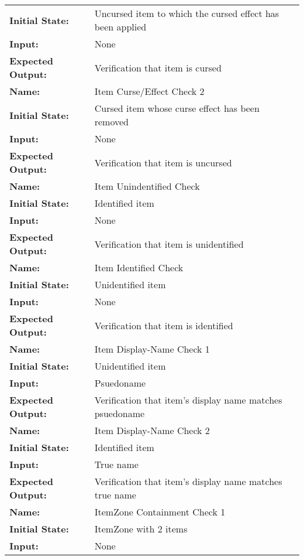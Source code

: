 \documentclass[12pt, titlepage]{article}
\begin{document}
\begin{center}
\begin{longtable}{ l | p{10cm} }
				\textbf{Initial State:} & Uncursed item to which the cursed effect has been applied\\
				\textbf{Input:} & None\\
				\textbf{Expected Output:} & Verification that item is cursed\\[0.6em]
				\hline
				\rule{0pt}{1.5em}\textbf{Name:} & Item Curse/Effect Check 2\\
				\textbf{Initial State:} & Cursed item whose curse effect has been removed\\
				\textbf{Input:} & None\\
				\textbf{Expected Output:} & Verification that item is uncursed\\[0.6em]
				\hline
				\rule{0pt}{1.5em}\textbf{Name:} & Item Unindentified Check\\
				\textbf{Initial State:} & Identified item\\
				\textbf{Input:} & None\\
				\textbf{Expected Output:} & Verification that item is unidentified\\[0.6em]
				\hline
				\rule{0pt}{1.5em}\textbf{Name:} & Item Identified Check\\
				\textbf{Initial State:} & Unidentified item\\
				\textbf{Input:} & None\\
				\textbf{Expected Output:} & Verification that item is identified\\[0.6em]
				\hline
				\rule{0pt}{1.5em}\textbf{Name:} & Item Display-Name Check 1\\
				\textbf{Initial State:} & Unidentified item\\
				\textbf{Input:} & Psuedoname\\
				\textbf{Expected Output:} & Verification that item's display name matches psuedoname\\[0.6em]
				\hline
				\rule{0pt}{1.5em}\textbf{Name:} & Item Display-Name Check 2\\
				\textbf{Initial State:} & Identified item\\
				\textbf{Input:} & True name\\
				\textbf{Expected Output:} & Verification that item's display name matches true name\\[0.6em]
				\hline
				\rule{0pt}{1.5em}\textbf{Name:} & ItemZone Containment Check 1\\
				\textbf{Initial State:} & ItemZone with 2 items\\
				\textbf{Input:} & None\\

\end{longtable}
\end{center}
\end{document}

